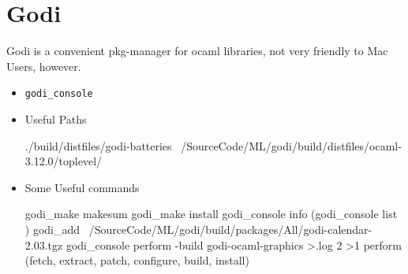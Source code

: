
\section{Godi}
\label{sec:godi}

Godi is a convenient pkg-manager for ocaml libraries, not very
friendly to Mac Users, however.
\begin{itemize}
\item \verb|godi_console |

\item Useful Paths \\
\begin{bluetext}
./build/distfiles/godi-batteries
~/SourceCode/ML/godi/build/distfiles/ocaml-3.12.0/toplevel/

\end{bluetext}


\item Some Useful commands
\begin{bluetext}
godi_make makesum
godi_make  install
godi_console info (godi_console list )
godi_add ~/SourceCode/ML/godi/build/packages/All/godi-calendar-2.03.tgz
godi_console perform -build godi-ocaml-graphics  >.log 2 >1
perform (fetch, extract, patch, configure, build, install)
\end{bluetext}
  
\end{itemize}

